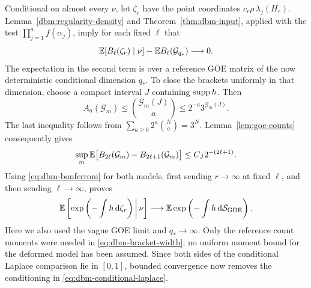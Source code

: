 Conditional on almost every \(\nu\), let \(\zeta_r\) have the point
coordinates \(c_r\rho\,\lambda_j(H_r)\).
Lemma~\ref{dbm:regularity-density} and Theorem~\ref{thm:dbm-input},
applied with the test \(\prod_{j=1}^a f(\alpha_j)\), imply for each
fixed \(\ell\) that
\[
 \mathbb E[B_\ell(\zeta_r)\mid\nu]
       -\mathbb E B_\ell(\mathcal G_{q_*})\longrightarrow0.
\]
The expectation in the second term is over a reference GOE matrix
of the now deterministic conditional dimension \(q_*\).
To close the brackets uniformly in that dimension, choose a compact
interval \(J\) containing \(\operatorname{supp} h\). Then
\[
 A_a(\mathcal G_m)\le
     \binom{\mathcal G_m(J)}a
     \le 2^{-a}3^{\mathcal G_m(J)}.
\]
The last inequality follows from
\(\sum_{a\ge0}2^a\binom{N}{a}=3^N\).
Lemma~\ref{lem:goe-counts} consequently gives
\begin{equation}
 \label{eq:dbm-bracket-width}
 \sup_m\mathbb E\bigl[B_{2\ell}(\mathcal G_m)
                 -B_{2\ell+1}(\mathcal G_m)\bigr]
       \le C_J2^{-(2\ell+1)}.
\end{equation}
Using \eqref{eq:dbm-bonferroni} for both models, first sending
\(r\to\infty\) at fixed \(\ell\), and then sending
\(\ell\to\infty\), proves
\begin{equation}
 \label{eq:dbm-conditional-laplace}
 \mathbb E\left[\exp\left(-\int h\,\mathrm d\zeta_r\right)\,\middle|\,\nu\right]
   \longrightarrow
 \mathbb E\exp\left(-\int h\,\mathrm d\mathcal S_{\mathrm{GOE}}\right).
\end{equation}
Here we also used the vague GOE limit and \(q_*\to\infty\).
Only the reference count moments were needed in
\eqref{eq:dbm-bracket-width}; no uniform moment bound for the
deformed model has been assumed. Since both sides of the conditional
Laplace comparison lie in \([0,1]\), bounded convergence now removes
the conditioning in \eqref{eq:dbm-conditional-laplace}.

